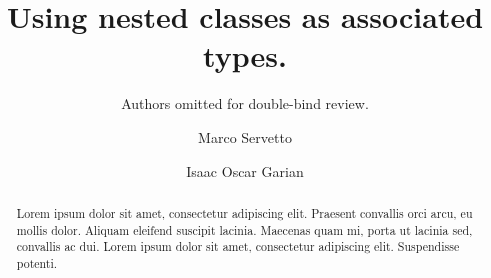 \documentclass[a4paper,UKenglish]{lipics-v2018}
\title{Using nested classes as associated types.}
\author{Authors omitted for double-bind review.}{Unspecified Institution.}{}{}{}
\author{Marco Servetto}{Victoria University of Wellington}{marco.servetto@ecs.vuw.ac.nz}{}{}
\author{Isaac Oscar Garian}{Victoria University of Wellington}{isaac@ecs.vuw.ac.nz}{}{}
\begin{document}
\maketitle

\begin{abstract}
Lorem ipsum dolor sit amet, consectetur adipiscing elit. Praesent convallis orci arcu, eu mollis dolor. Aliquam eleifend suscipit lacinia. Maecenas quam mi, porta ut lacinia sed, convallis ac dui. Lorem ipsum dolor sit amet, consectetur adipiscing elit. Suspendisse potenti. 
 \end{abstract}




\appendix


\end{document}
